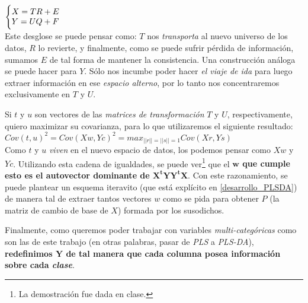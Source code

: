 $\Bigg\{
\begin{array}{@{}ll@{}}
	X = TR + E \\
	Y = UQ + F
\end{array}$ \\

Este desglose se puede pensar como: $T$ nos \textit{transporta} al nuevo universo de los datos, $R$ lo revierte, y finalmente, como se puede sufrir p\'erdida de informaci\'on, sumamos $E$ de tal forma de mantener la consistencia. Una construcci\'on an\'aloga se puede hacer para $Y$. S\'olo nos incumbe poder hacer \textit{el viaje de ida} para luego extraer informaci\'on en ese \textit{espacio alterno}, por lo tanto nos concentraremos exclusivamente en $T$ y $U$.

Si $t$ y $u$ son vectores de las \textit{matrices de transformaci\'on} $T$ y $U$, respectivamente, quiero maximizar su covarianza, para lo que utilizaremos el siguiente resultado: \\


$Cov(t, u)^{2} = Cov(Xw, Yc)^{2} = max_{\vert \vert r \vert \vert = \vert \vert s \vert \vert = 1} Cov(Xr, Ys)$ \\

Como $t$ y $u$ \textit{viven} en el nuevo espacio de datos, los podemos pensar como $Xw$ y $Yc$. Utilizando esta cadena de igualdades, se puede ver\footnote{La demostraci\'on fue dada en clase.} que el \textbf{$\mathbf{w}$ que cumple esto es el autovector dominante de $\mathbf{X^{t}YY^{t}X}$}. Con este razonamiento, se puede plantear un esquema iteravito (que est\'a expl\'icito en \ref{desarrollo_PLSDA}) de manera tal de extraer tantos vectores $w$ como se pida para obtener $P$ (la matriz de cambio de base de $X$) formada por los susodichos.

Finalmente, como queremos poder trabajar con variables \textit{multi-categ\'oricas} como son las de este trabajo (en otras palabras, pasar de \textit{PLS} a \textit{PLS-DA}), \textbf{redefinimos $\mathbf{Y}$ de tal manera que cada columna posea informaci\'on sobre cada \textit{clase}}.